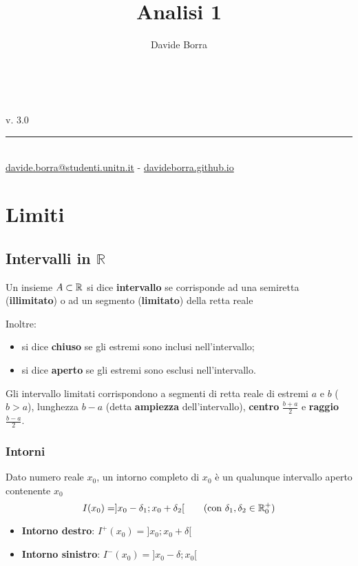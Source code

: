\documentclass{book}     %
\title{Analisi 1}
\author{Davide Borra}
\date{}
\makeatletter
\let\runauthor\@author
\let\runtitle\@title
\makeatother
\begin{document}
\lhead{}
\chead{}
\rfoot{\runauthor}

\begin{titlepage}
    \pagestyle{empty}
    \begin{center}
        \vspace*{\fill}
        \vspace{0.5cm}
        \textbf{\Huge \runtitle}\\\vspace{5mm}
        \textsc{\Large \runauthor}
        \vspace{5cm}
    \end{center}
    \vspace*{\fill}
    v. 3.0\\
    \rule{0.8\linewidth}{0.5mm}\\
    {\footnotesize\href{mailto:davide.borra@studenti.unitn.it}{davide.borra@studenti.unitn.it} - \href{http://davideborra.github.io}{davideborra.github.io}}
    \restoregeometry
\end{titlepage}
\thispagestyle{empty}
\frontmatter
    \tableofcontents
    \creativecommons
\mainmatter
{}
\chead{}
\rhead{\leftmark\ - \rightmark}
\rfoot{\runauthor}


\chapter{Limiti}
\section{Intervalli in $\mathbb{R}$}
\begin{boxdef}
    Un insieme $A \subset \mathbb{R}$ si dice \textbf{intervallo} se corrisponde ad una semiretta (\textbf{illimitato}) o ad un segmento (\textbf{limitato}) della retta reale
\end{boxdef}
Inoltre:
\begin{itemize}
    \item si dice \textbf{chiuso} se gli estremi sono inclusi nell'intervallo;
    \item si dice \textbf{aperto} se gli estremi sono esclusi nell'intervallo.
\end{itemize}
Gli intervallo limitati corrispondono a segmenti di retta reale di estremi $a$ e $b$ ($b>a$), lunghezza $b-a$ (detta \textbf{ampiezza} dell'intervallo), \textbf{centro} $\frac{b+a}{2}$ e \textbf{raggio} $\frac{b-a}{2}$.
\subsection{Intorni}
\begin{boxdef}
    Dato numero reale $x_0$, un intorno completo di $x_0$ è un qualunque intervallo aperto contenente $x_0$ \[I(x_0)=]x_0-\delta_1;x_0+\delta_2[ ~~~~~~ (\text{con }\delta_1, \delta_2 \in \mathbb{R}_0^+ )\]
\end{boxdef}
\begin{itemize}
    \item \textbf{Intorno destro}: $I^+(x_0)=]x_0;x_0+\delta[$
    \item \textbf{Intorno sinistro}: $I^-(x_0)=]x_0-\delta;x_0[$
\end{itemize}
\end{document}
